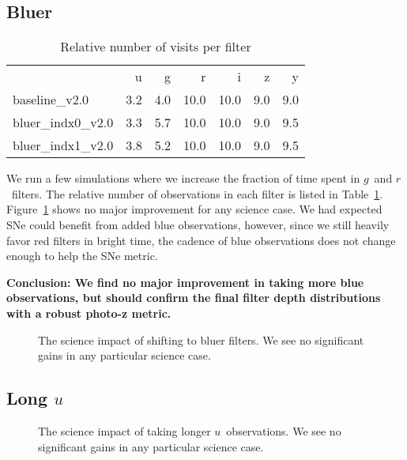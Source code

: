 \subsection{Bluer}

\begin{table}
\caption{Relative number of visits per filter}
\begin{tabular}{lrrrrrr}
\toprule
{} &   u &   g &    r &    i &   z &   y \\
baseline\_v2.0    & 3.2 & 4.0 & 10.0 & 10.0 & 9.0 & 9.0 \\
bluer\_indx0\_v2.0 & 3.3 & 5.7 & 10.0 & 10.0 & 9.0 & 9.5 \\
bluer\_indx1\_v2.0 & 3.8 & 5.2 & 10.0 & 10.0 & 9.0 & 9.5 \\
\end{tabular}
\label{table:blue}
\end{table}

We run a few simulations where we increase the fraction of time spent in $g$\ and $r$\ filters. The relative number of observations in each filter is listed in Table~\ref{table:blue}. Figure~\ref{fig:bluer_radar} shows no major improvement for any science case. We had expected SNe could benefit from added blue observations, however, since we still heavily favor red filters in bright time, the cadence of blue observations does not change enough to help the SNe metric.

{\bf Conclusion:  We find no major improvement in taking more blue observations, but should confirm the final filter depth distributions with a robust photo-z metric.}

\begin{figure}
\caption{The science impact of shifting to bluer filters. We see no significant gains in any particular science case.\label{fig:bluer_radar}}
\end{figure}

\subsection{Long $u$}

\begin{figure}
\caption{The science impact of taking longer $u$\ observations. We see no significant gains in any particular science case.\label{fig:long_u}}
\end{figure}


